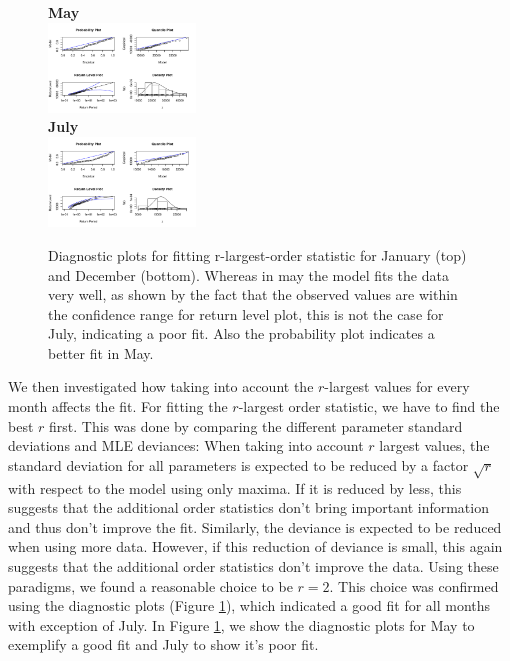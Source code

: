 \documentclass[10pt,conference,compsocconf]{IEEEtran}
\begin{document}
\par
\begin{figure}
	\centering
	\textbf{May}\\
	\includegraphics[width=0.35\textwidth]{../plots/r_larg_diag_may.pdf}\\
	\textbf{July}\\
	\includegraphics[width=0.35\textwidth]{../plots/r_larg_diag_july.pdf}
	\caption{Diagnostic plots for fitting r-largest-order statistic for January (top) and December (bottom). Whereas in may the model fits the data very well, as shown by the fact that the observed values are within the confidence range for return level plot, this is not the case for July, indicating a poor fit. Also the probability plot indicates a better fit in May.}
	\label{fig:r_diag}
\end{figure}
We then investigated how taking into account the $r$-largest values for every month affects the fit. For fitting the $r$-largest order statistic, we have to find the best $r$ first. This was done by comparing the different parameter standard deviations and MLE deviances: When taking into account $r$ largest values, the standard deviation for all parameters is expected to be reduced by a factor $\sqrt{r}$ with respect to the model using only maxima. If it is reduced by less, this suggests that the additional order statistics don't bring important information and thus don't improve the fit. Similarly, the deviance is expected to be reduced when using more data. However, if this reduction of deviance is small, this again suggests that the additional order statistics don't improve the data. Using these paradigms, we found a reasonable choice to be $r=2$. This choice was confirmed using the diagnostic plots (Figure \ref{fig:r_diag}), which indicated a good fit for all months with exception of July. In Figure \ref{fig:r_diag}, we show the diagnostic plots for May to exemplify a good fit and July to show it's poor fit. 
\end{document}
